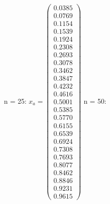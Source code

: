 \documentclass{udpreport}
\begin{document}
\begin{enumerate}
\begin{enumerate}
{{{{ 	        n = 25: 
 	       	$x_{a} = \left(\begin{array}{c} 0.0385\\ 0.0769\\ 0.1154\\ 0.1539\\ 0.1924\\ 0.2308\\ 0.2693\\ 0.3078\\ 0.3462\\ 0.3847\\ 0.4232\\ 0.4616\\ 0.5001\\ 0.5385\\ 0.5770\\ 0.6155\\ 0.6539\\ 0.6924\\ 0.7308\\ 0.7693\\ 0.8077\\ 0.8462\\ 0.8846\\ 0.9231\\ 0.9615 \end{array}\right) $
 	        n = 50:
}}}}
\end{enumerate}
\end{enumerate}
\end{document}
